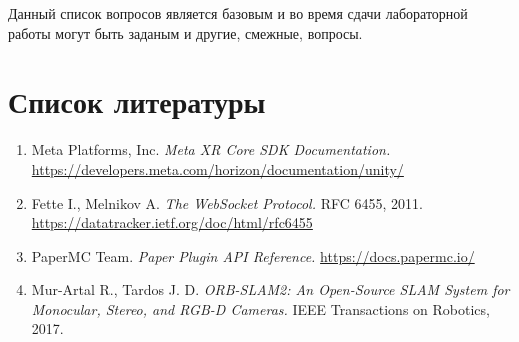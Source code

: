 \documentclass[a4paper,12pt]{article}
\begin{document}
Данный список вопросов является базовым и во время сдачи лабораторной работы могут быть заданым и другие, смежные, вопросы.



\section*{Список литературы}

\begin{enumerate}
    \item Meta Platforms, Inc. \textit{Meta XR Core SDK Documentation.} \url{https://developers.meta.com/horizon/documentation/unity/}
    \item Fette I., Melnikov A. \textit{The WebSocket Protocol.} RFC 6455, 2011. \url{https://datatracker.ietf.org/doc/html/rfc6455}
    \item PaperMC Team. \textit{Paper Plugin API Reference.} \url{https://docs.papermc.io/}
    \item Mur-Artal R., Tardos J. D. \textit{ORB-SLAM2: An Open-Source SLAM System for Monocular, Stereo, and RGB-D Cameras.} IEEE Transactions on Robotics, 2017.
\end{enumerate}
\end{document}
